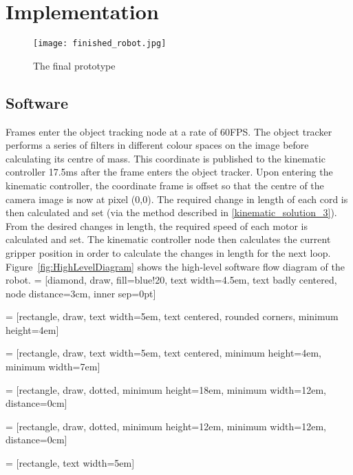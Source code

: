 \documentclass[conference]{IEEEtran}
\begin{document}
\section{Implementation}
\begin{figure}\label{fullPicture}
	\centering
	
	\texttt{[image: finished\_robot.jpg]}
	\caption{The final prototype}
\end{figure}
\subsection{Software}
Frames enter the object tracking node at a rate of 60FPS. The object tracker performs a series of filters in different colour spaces on the image before calculating its centre of mass. This coordinate is published to the kinematic controller 17.5ms after the frame enters the object tracker. Upon entering the kinematic controller, the coordinate frame is offset so that the centre of the camera image is now at pixel (0,0). The required change in length of each cord is then calculated and set (via the method described in \ref{kinematic_solution_3}). From the desired changes in length, the required speed of each motor is calculated and set. The kinematic controller node then calculates the current gripper position in order to calculate the changes in length for the next loop.
Figure~\ref{fig:HighLevelDiagram} shows the high-level software flow diagram of the robot.
 = [diamond, draw, fill=blue!20, 
text width=4.5em, text badly centered, node distance=3cm, inner sep=0pt]

 = [rectangle, draw, 
text width=5em, text centered, rounded corners, minimum height=4em]

 = [rectangle, draw, 
text width=5em, text centered, minimum height=4em, minimum width=7em]

 = [rectangle, draw, dotted, minimum height=18em, minimum width=12em, distance=0cm]

 = [rectangle, draw, dotted, minimum height=12em, minimum width=12em, distance=0cm]

 = [rectangle, text width=5em]
\end{document}
